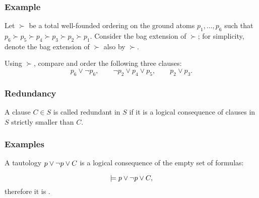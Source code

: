 \begin{frame}\frametitle{Example}

  Let $\succ$ be a total well-founded ordering on the ground atoms
$p_1, \ldots, p_6$ such that $p_6\succ p_5\succ p_4\succ p_3 \succ p_2
\succ p_1$. Consider
the bag extension of $\succ$; for simplicity, denote the bag extension 
of $\succ$ also by $\succ$. 

\bigskip


Using $\succ$, compare and order the following three clauses: 
\[p_6\vee \neg p_6,\qquad \neg p_2\vee
  p_4\vee p_5, \qquad p_2\vee p_3.\]

 \end{frame} 
                                
                                
                     \begin{frame}\frametitle{Redundancy}

A clause $C \in S$ is called \alert{redundant in $S$} if it is a
logical consequence of clauses in $S$ strictly smaller than $C$.

                              \end{frame}



              	   \begin{frame}
           \frametitle{Examples}

A \alert{tautology} $p \vee \neg p \vee C$ is a logical consequence of the
empty set of formulas:

\[
\models p \vee \neg p \vee C,
\]
therefore it is .


\medskip


                           \end{frame}

